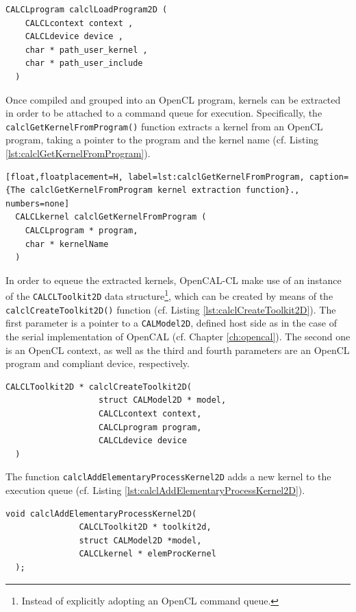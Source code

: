 \begin{lstlisting}[float,floatplacement=H, label=lst:calclLoadProgram, caption={The calclLoadProgramLib function. It loads and compiles kernels by returning an OpenCL program.}, numbers=none]
  CALCLprogram calclLoadProgram2D (
    CALCLcontext context ,
    CALCLdevice device ,
    char * path_user_kernel ,
    char * path_user_include
  )
\end{lstlisting}

Once compiled and grouped into an OpenCL program, kernels can be
extracted in order to be attached to a command queue for
execution. Specifically, the \verb'calclGetKernelFromProgram()'
function extracts a kernel from an OpenCL program, taking a pointer to
the program and the kernel name (cf. Listing
\ref{lst:calclGetKernelFromProgram}).

\begin{lstlisting}[float,floatplacement=H, label=lst:calclGetKernelFromProgram, caption={The calclGetKernelFromProgram kernel extraction function}., numbers=none]
  CALCLkernel calclGetKernelFromProgram (
    CALCLprogram * program,
    char * kernelName 
  )
\end{lstlisting}

In order to equeue the extracted kernels, OpenCAL-CL make use of an
instance of the \verb'CALCLToolkit2D' data structure\footnote{Instead
  of explicitly adopting an OpenCL command queue.}, which can be
created by means of the \verb'calclCreateToolkit2D()' function
(cf. Listing \ref{lst:calclCreateToolkit2D}). The first parameter is a
pointer to a \verb'CALModel2D', defined host side as in the case of the
serial implementation of OpenCAL (cf. Chapter \ref{ch:opencal}). The
second one is an OpenCL context, as well as the third and fourth
parameters are an OpenCL program and compliant device, respectively.

\begin{lstlisting}[float,floatplacement=H, label=lst:calclCreateToolkit2D, caption=The calclCreateToolkit2D data structure., numbers=none]
  CALCLToolkit2D * calclCreateToolkit2D(
                   struct CALModel2D * model,
                   CALCLcontext context,
                   CALCLprogram program,
                   CALCLdevice device
  )
\end{lstlisting}

The function \verb'calclAddElementaryProcessKernel2D' adds a new
kernel to the execution queue
(cf. Listing \ref{lst:calclAddElementaryProcessKernel2D}).

\begin{lstlisting}[float,floatplacement=H, label=lst:calclAddElementaryProcessKernel2D, caption=The calclCreateToolkit2D function., numbers=none]
  void calclAddElementaryProcessKernel2D(
               CALCLToolkit2D * toolkit2d,
               struct CALModel2D *model,
               CALCLkernel * elemProcKernel
  );
\end{lstlisting}



